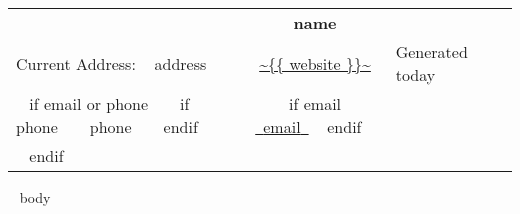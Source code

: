 \documentclass{article}
\begin{document}
\thispagestyle{empty} %

\begin{tabularx}{\textwidth}{@{} X c Z @{}}
  &{\LARGE \bf ~{{ name }}~}&\\

  Current Address: ~{{ address }}~&
  \url{~{{ website }}~}&
  Generated ~{{ today }}~\\

  ~{ if email or phone }~
    ~{ if phone }~ ~{{ phone }}~ ~{ endif }~&
    ~{ if email }~ \href{mailto:~{{ email }}~}{~{{email}}~} ~{ endif }~\\
  ~{ endif }~
\end{tabularx}


~{{ body }}~
\end{document}
